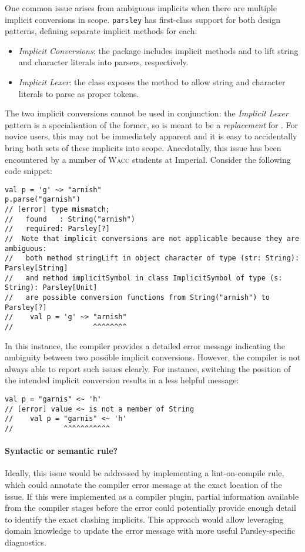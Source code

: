 \documentclass[../../main.tex]{subfiles}
\begin{document}
One common issue arises from ambiguous implicits when there are multiple implicit conversions in scope.
\texttt{parsley} has first-class support for both design patterns, defining separate implicit methods for each:
\begin{itemize}
  \item \emph{Implicit Conversions}: the  package includes implicit methods  and  to lift string and character literals into parsers, respectively.
  \item \emph{Implicit Lexer}: the  class exposes the  method to allow string and character literals to parse as proper tokens.
\end{itemize}
%
The two implicit conversions cannot be used in conjunction: the \emph{Implicit Lexer} pattern is a specialisation of the former, so  is meant to be a \emph{replacement} for .
For novice users, this may not be immediately apparent and it is easy to accidentally bring both sets of these implicits into scope.
Anecdotally, this issue has been encountered by a number of \textsc{Wacc} students at Imperial.
Consider the following code snippet:
\begin{verbatim}
val p = 'g' ~> "arnish"
p.parse("garnish")
// [error] type mismatch;
//   found   : String("arnish")
//   required: Parsley[?]
//  Note that implicit conversions are not applicable because they are ambiguous:
//   both method stringLift in object character of type (str: String): Parsley[String]
//   and method implicitSymbol in class ImplicitSymbol of type (s: String): Parsley[Unit]
//   are possible conversion functions from String("arnish") to Parsley[?]
//    val p = 'g' ~> "arnish"
//                   ^^^^^^^^
\end{verbatim}
%
In this instance, the compiler provides a detailed error message indicating the ambiguity between two possible implicit conversions.
However, the compiler is not always able to report such issues clearly. For instance, switching the position of the intended implicit conversion results in a less helpful message:
\begin{verbatim}
val p = "garnis" <~ 'h'
// [error] value <~ is not a member of String
//    val p = "garnis" <~ 'h'
//            ^^^^^^^^^^^
\end{verbatim}

\paragraph{Syntactic or semantic rule?}
Ideally, this issue would be addressed by implementing a lint-on-compile rule, which could annotate the compiler error message at the exact location of the issue.
If this were implemented as a compiler plugin, partial information available from the compiler stages before the error could potentially provide enough detail to identify the exact clashing implicits.
This approach would allow leveraging domain knowledge to update the error message with more useful Parsley-specific diagnostics.
\end{document}
